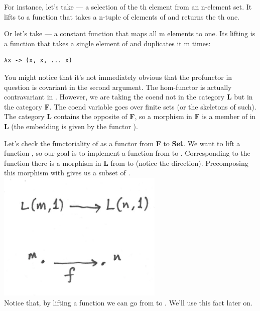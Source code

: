For instance, let's take  --- a
selection of the th element from an n-element set. It lifts to
a function that takes a n-tuple of elements of  and returns
the th one.

Or let's take  --- a constant
function that maps all m elements to one. Its lifting is a function that
takes a single element of  and duplicates it m times:

\begin{verbatim}
λx -> (x, x, ... x)
\end{verbatim}

You might notice that it's not immediately obvious that the profunctor
in question is covariant in the second argument. The hom-functor
 is actually contravariant in . However, we
are taking the coend not in the category \textbf{L} but in the category
\textbf{F}. The coend variable  goes over finite sets (or the
skeletons of such). The category \textbf{L} contains the opposite of
\textbf{F}, so a morphism  in \textbf{F}
is a member of  in \textbf{L} (the embedding is given
by the functor ).

Let's check the functoriality of  as a functor from
\textbf{F} to \textbf{Set}. We want to lift a function
, so our goal is to implement a
function from  to . Corresponding to
the function  there is a morphism in \textbf{L} from
 to  (notice the direction). Precomposing this
morphism with  gives us a subset of
.\\
\includegraphics[width=3.12500in]{images/liftl.png}\\
Notice that, by lifting a function  we can go
from  to . We'll use this fact later
on.

